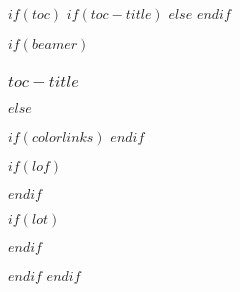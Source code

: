 $if(toc)$
$if(toc-title)$
\renewcommand*\contentsname{$toc-title$} %
$else$
\renewcommand*\contentsname{Table of Contents} %
$endif$

$if(beamer)$
\begin{frame}[allowframebreaks]
  \frametitle{$toc-title$}
  \tableofcontents[hideallsubsections]
\end{frame}
$else$
{
$if(colorlinks)$
\hypersetup{linkcolor=$if(toccolor)$$toccolor$$else$$endif$}
$endif$

\setcounter{tocdepth}{$toc-depth$}

\renewcommand{\numberline}[1]{}
\titleformat{\chapter}[display]{\normalfont\bfseries}{}{0pt}{}

$if(lof)$
$endif$

$if(lot)$
$endif$

}
$endif$
$endif$
